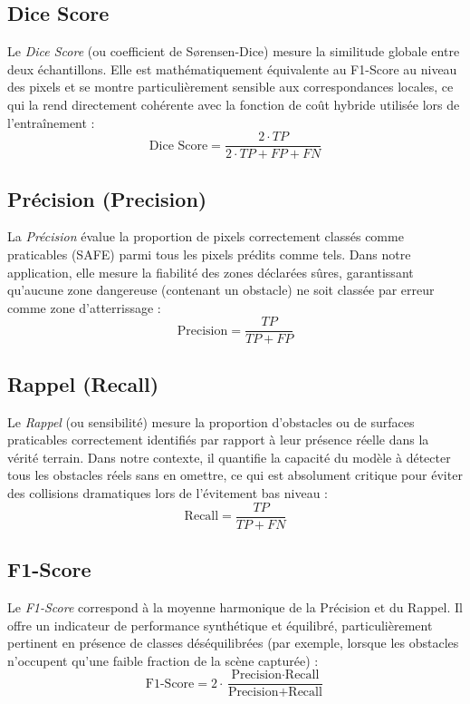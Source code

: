 \subsection{Dice Score}
Le \textit{Dice Score} (ou coefficient de Sørensen-Dice) mesure la similitude globale entre deux échantillons. Elle est mathématiquement équivalente au F1-Score au niveau des pixels et se montre particulièrement sensible aux correspondances locales, ce qui la rend directement cohérente avec la fonction de coût hybride utilisée lors de l'entraînement :
\begin{equation}
  \text{Dice Score} = \frac{2 \cdot TP}{2 \cdot TP + FP + FN}
\end{equation}

\subsection{Précision (Precision)}
La \textit{Précision} évalue la proportion de pixels correctement classés comme praticables (SAFE) parmi tous les pixels prédits comme tels. Dans notre application, elle mesure la fiabilité des zones déclarées sûres, garantissant qu'aucune zone dangereuse (contenant un obstacle) ne soit classée par erreur comme zone d'atterrissage :
\begin{equation}
  \text{Precision} = \frac{TP}{TP + FP}
\end{equation}

\subsection{Rappel (Recall)}
Le \textit{Rappel} (ou sensibilité) mesure la proportion d'obstacles ou de surfaces praticables correctement identifiés par rapport à leur présence réelle dans la vérité terrain. Dans notre contexte, il quantifie la capacité du modèle à détecter tous les obstacles réels sans en omettre, ce qui est absolument critique pour éviter des collisions dramatiques lors de l'évitement bas niveau :
\begin{equation}
  \text{Recall} = \frac{TP}{TP + FN}
\end{equation}

\subsection{F1-Score}
Le \textit{F1-Score} correspond à la moyenne harmonique de la Précision et du Rappel. Il offre un indicateur de performance synthétique et équilibré, particulièrement pertinent en présence de classes déséquilibrées (par exemple, lorsque les obstacles n'occupent qu'une faible fraction de la scène capturée) :
\begin{equation}
  \text{F1-Score} = 2 \cdot \frac{\text{Precision} \cdot \text{Recall}}{\text{Precision} + \text{Recall}}
\end{equation}

